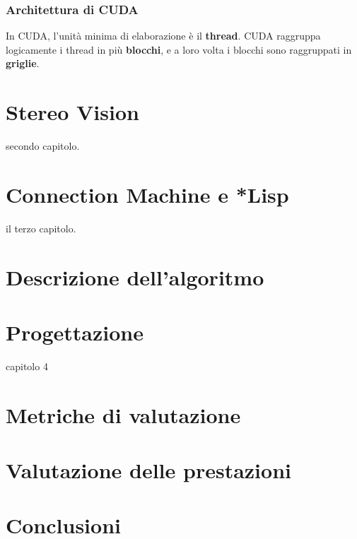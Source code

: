 \documentclass[12pt,a4paper,openright,twoside]{report}
\begin{document}
\subsection{Architettura di CUDA}

In CUDA, l'unità minima di elaborazione è il \textbf{thread}. CUDA raggruppa logicamente i thread in più \textbf{blocchi}, e a loro volta i blocchi sono raggruppati in \textbf{griglie}.




\chapter{Stereo Vision}

secondo capitolo.



\chapter{Connection Machine e *Lisp}

il terzo capitolo.



\chapter{Descrizione dell'algoritmo}



\chapter{Progettazione}

capitolo 4



\chapter{Metriche di valutazione}

\chapter{Valutazione delle prestazioni}

\chapter*{Conclusioni}

\end{document}
